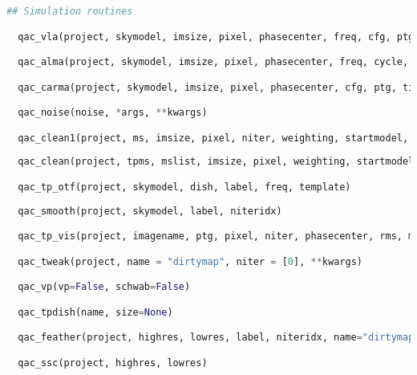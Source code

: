 \documentclass[12pt,a4paper]{article}
\begin{document}
\begin{lstlisting}[language=python]
## Simulation routines

  qac_vla(project, skymodel, imsize, pixel, phasecenter, freq, cfg, ptg, noise)

  qac_alma(project, skymodel, imsize, pixel, phasecenter, freq, cycle, cfg, ptg)

  qac_carma(project, skymodel, imsize, pixel, phasecenter, cfg, ptg, times)

  qac_noise(noise, *args, **kwargs)

  qac_clean1(project, ms, imsize, pixel, niter, weighting, startmodel, phasecenter, t, do_concat, **kwargs)
  
  qac_clean(project, tpms, mslist, imsize, pixel, weighting, startmodel, phasecenter, niter, do_concat, do_int, do_cleanup, **kwargs)  

  qac_tp_otf(project, skymodel, dish, label, freq, template)
  
  qac_smooth(project, skymodel, label, niteridx)

  qac_tp_vis(project, imagename, ptg, pixel, niter, phasecenter, rms, maxuv, nvgrp, fix,  deconv, **kwargs)

  qac_tweak(project, name = "dirtymap", niter = [0], **kwargs)

  qac_vp(vp=False, schwab=False)

  qac_tpdish(name, size=None)

  qac_feather(project, highres, lowres, label, niteridx, name="dirtymap")

  qac_ssc(project, highres, lowres)

\end{lstlisting}
\end{document}
